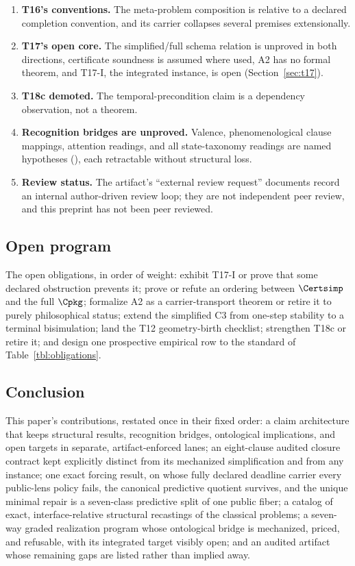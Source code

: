 \begin{enumerate}
audited induced geometry.
\item \textbf{T16's conventions.} The meta-problem composition is relative
to a declared completion convention, and its carrier collapses several
premises extensionally.
\item \textbf{T17's open core.} The simplified/full schema relation is
unproved in both directions, certificate soundness is assumed where used,
A2 has no formal theorem, and T17-I, the integrated instance, is open
(Section~\ref{sec:t17}).
\item \textbf{T18c demoted.} The temporal-precondition claim is a dependency
observation, not a theorem.
\item \textbf{Recognition bridges are unproved.} Valence, phenomenological
clause mappings, attention readings, and all state-taxonomy readings are
named hypotheses (\gradeR), each retractable without structural loss.
\item \textbf{Review status.} The artifact's ``external review request''
documents record an internal author-driven review loop; they are not
independent peer review, and this preprint has not been peer reviewed.
\end{enumerate}

\subsection{Open program}

The open obligations, in order of weight: exhibit T17-I or prove that some
declared obstruction prevents it; prove or refute an ordering between
$\Certsimp$ and the full $\Cpkg$; formalize A2 as a carrier-transport theorem
or retire it to purely philosophical status; extend the simplified C3 from
one-step stability to a terminal bisimulation; land the T12 geometry-birth
checklist; strengthen T18c or retire it; and design one prospective empirical
row to the standard of Table~\ref{tbl:obligations}.

\subsection{Conclusion}

This paper's contributions, restated once in their fixed order: a claim
architecture that keeps structural results, recognition bridges, ontological
implications, and open targets in separate, artifact-enforced lanes; an
eight-clause audited closure contract kept explicitly distinct from its
mechanized simplification and from any instance; one exact forcing result,
on whose fully declared deadline carrier every public-lens policy fails,
the canonical predictive quotient survives, and the unique minimal repair is a
seven-class predictive split of one public fiber; a catalog of exact,
interface-relative structural recastings of the classical problems; a
seven-way graded realization program whose ontological bridge is mechanized,
priced, and refusable, with its integrated target visibly open; and an
audited artifact whose remaining gaps are listed rather than implied away.

